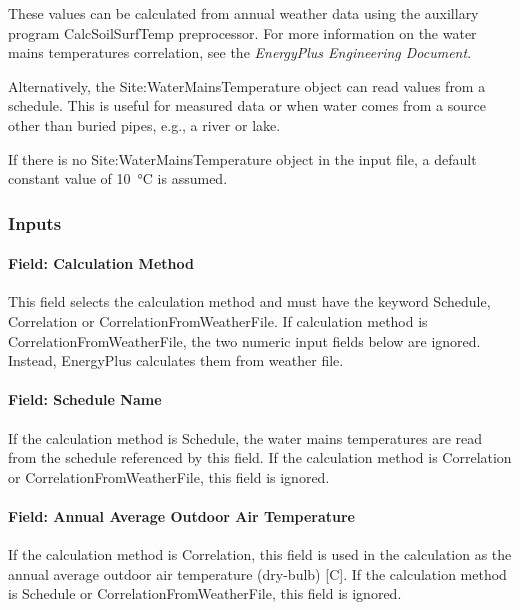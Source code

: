 These values can be calculated from annual weather data using the auxillary program CalcSoilSurfTemp preprocessor. For more information on the water mains temperatures correlation, see the \emph{EnergyPlus Engineering Document}.

Alternatively, the Site:WaterMainsTemperature object can read values from a schedule. This is useful for measured data or when water comes from a source other than buried pipes, e.g., a river or lake.

If there is no Site:WaterMainsTemperature object in the input file, a default constant value of \SI{10}{\degreeCelsius} is assumed.

\subsubsection{Inputs}\label{inputs-21-003}

\paragraph{Field: Calculation Method}\label{field-calculation-method}

This field selects the calculation method and must have the keyword Schedule, Correlation or CorrelationFromWeatherFile. If calculation method is CorrelationFromWeatherFile, the two numeric input fields below are ignored. Instead, EnergyPlus calculates them from weather file.

\paragraph{Field: Schedule Name}\label{field-schedule-name-003}

If the calculation method is Schedule, the water mains temperatures are read from the schedule referenced by this field. If the calculation method is Correlation or CorrelationFromWeatherFile, this field is ignored.

\paragraph{Field: Annual Average Outdoor Air Temperature}\label{field-annual-average-outdoor-air-temperature}

If the calculation method is Correlation, this field is used in the calculation as the annual average outdoor air temperature (dry-bulb) {[}C{]}. If the calculation method is Schedule or CorrelationFromWeatherFile, this field is ignored.

